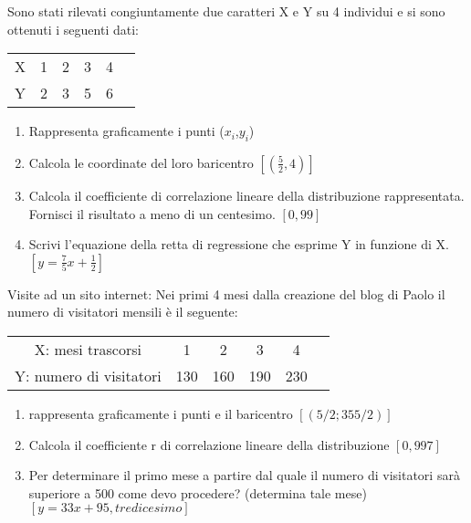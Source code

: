 \begin{esercizio}
\label{ese:c_stat_007}
Sono stati rilevati congiuntamente due caratteri X e Y su 4 
individui e si sono ottenuti i seguenti dati:
\begin{center}
\begin{tabular}{cccccc}
\toprule 
X& 1& 2& 3& 4\\
Y& 2& 3& 5& 6\\
\bottomrule 
\end{tabular}
\end{center}
\begin{enumerate}
\item Rappresenta graficamente i punti (\(x_i\),\(y_i\))
\item Calcola le coordinate del loro baricentro \hfill 
\([(\frac{5}{2},4)]\)
\item Calcola il coefficiente di correlazione lineare della 
distribuzione rappresentata. Fornisci il risultato a meno di un centesimo. 
\hfill \([0,99]\)
\item Scrivi l'equazione della retta di regressione che 
esprime Y in funzione di X. \hfill \([y=\frac{7}{5}x+\frac{1}{2}]\)
\end{enumerate}
\end{esercizio}

\begin{esercizio}
\label{ese:c_stat_008}
Visite ad un sito internet: Nei primi 4 mesi dalla creazione del blog 
di Paolo il numero di visitatori mensili è il seguente:

\begin{center}
\begin{tabular}{cccccc}
\toprule
X: mesi trascorsi & 1 & 2 & 3 & 4\\
Y: numero di visitatori & 130 & 160 & 190 & 230\\
\bottomrule 
\end{tabular}
\end{center}

\begin{enumerate}
\item rappresenta graficamente i punti e il baricentro \hfill 
\([(5/2; 355/2)]\)
\item Calcola il coefficiente r di correlazione lineare della 
distribuzione \hfill \([0,997]\)
\item Per determinare il primo mese a partire dal quale il numero 
di visitatori sarà superiore a 500 come devo procedere? (determina tale 
mese) \hfill \([y=33x+95, tredicesimo]\)
\end{enumerate}
\end{esercizio}

